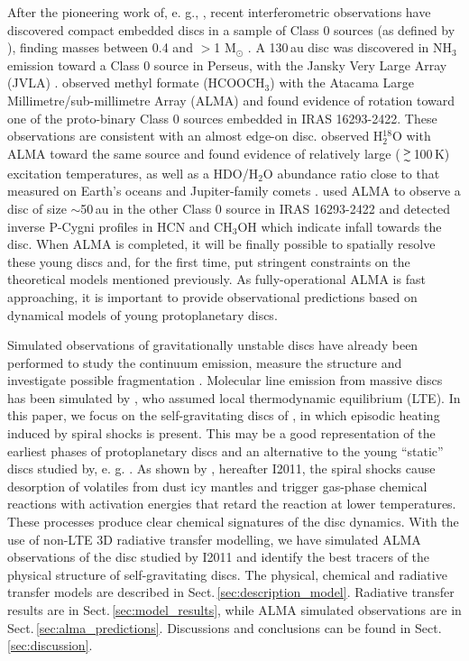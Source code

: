 \documentclass[useAMS,usenatbib]{mn2e}
\begin{document}
After the pioneering work of, e. g., \citet{Chandler1995,Brown2000,Looney2000}, recent interferometric observations have discovered compact embedded discs in a sample of Class 0 sources (as defined by \citealt{Andre1999}), finding masses between 0.4 and  $>$1 M$_{\odot}$ \citep{Jorgensen2007,Jorgensen2009,Enoch2011}. A 130\,au disc was discovered in NH$_3$ emission toward a Class 0 source in Perseus, with the Jansky Very Large Array (JVLA) \citep{Choi2007}. \citet{Pineda2012} observed methyl formate (HCOOCH$_3$) with the Atacama Large Millimetre/sub-millimetre Array (ALMA) and found evidence of rotation toward one of the proto-binary Class 0 sources embedded in IRAS 16293-2422. These observations are consistent with an almost edge-on disc. \citet{Persson2012} observed H$_2^{18}$O with ALMA toward the same source and found evidence of relatively large ($\ga$100\,K) excitation temperatures, as well as a HDO/H$_2$O abundance ratio close to that measured on Earth's oceans and Jupiter-family comets \citep{Hartogh2012}. \citet{Zapata2013} used ALMA to observe a disc of size $\sim$50$\,$au in the other Class 0 source in IRAS 16293-2422 and detected inverse P-Cygni profiles in HCN and CH$_3$OH which indicate infall towards the disc. When ALMA is completed, it will be finally possible to spatially resolve these young discs and, for the first time, put stringent constraints on the theoretical models mentioned previously. As fully-operational ALMA is fast approaching, it is important to provide observational predictions based on dynamical models of young protoplanetary discs. \smallskip 

Simulated observations of gravitationally unstable discs have already been performed to study the continuum emission, measure the structure and investigate possible fragmentation \citep{Cossins2010,Ruge2013}. Molecular line emission from massive discs has been simulated by \citet{Krumholz2007}, who assumed local thermodynamic equilibrium (LTE). In this paper, we focus on the self-gravitating discs of \citet{Boley2008}, in which episodic heating induced by spiral shocks is present. This may be a good representation of the earliest phases of protoplanetary discs and an alternative to the young ``static'' discs studied by, e. g. \citet{Visser2009,Visser2011}. As shown by \citet{Ilee2011}, hereafter I2011, the spiral shocks cause desorption of volatiles from dust icy mantles and trigger gas-phase chemical reactions with activation energies that retard the reaction at lower temperatures. These processes produce clear chemical signatures of the disc dynamics. With the use of non-LTE 3D radiative transfer modelling, we have simulated ALMA observations of the disc studied by I2011 and identify the best tracers of the physical structure of self-gravitating discs. The physical, chemical and radiative transfer models are described in Sect.\,\ref{sec:description_model}. Radiative transfer results are in Sect.\,\ref{sec:model_results}, while ALMA simulated observations are in Sect.\,\ref{sec:alma_predictions}. Discussions and conclusions can be found in Sect.\,\ref{sec:discussion}. 
\end{document}
